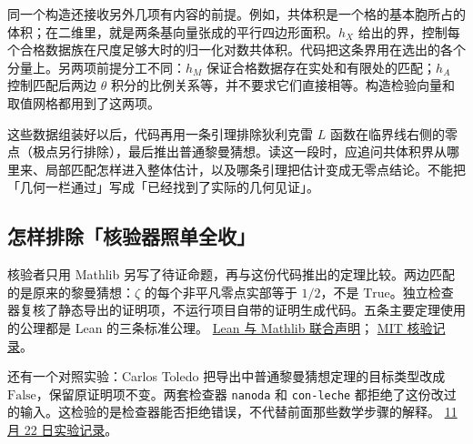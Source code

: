 同一个构造还接收另外几项有内容的前提。例如，共体积是一个格的基本胞所占的体积；在二维里，就是两条基向量张成的平行四边形面积。$h_X$ 给出的界，控制每个合格数据族在尺度足够大时的归一化对数共体积。代码把这条界用在选出的各个分量上。另两项前提分工不同：$h_M$ 保证合格数据存在实处和有限处的匹配；$h_A$ 控制匹配后两边 $\theta$ 积分的比例关系等，并不要求它们直接相等。构造检验向量和取值网格都用到了这两项。

这些数据组装好以后，代码再用一条引理排除狄利克雷 $L$ 函数在临界线右侧的零点（极点另行排除），最后推出普通黎曼猜想。读这一段时，应追问共体积界从哪里来、局部匹配怎样进入整体估计，以及哪条引理把估计变成无零点结论。不能把「几何一栏通过」写成「已经找到了实际的几何见证」。

\subsection{怎样排除「核验器照单全收」}

核验者只用 Mathlib 另写了待证命题，再与这份代码推出的定理比较。两边匹配的是原来的黎曼猜想：$\zeta$ 的每个非平凡零点实部等于 $1/2$，不是 $\mathrm{True}$。独立检查器复核了静态导出的证明项，不运行项目自带的证明生成代码。五条主要定理使用的公理都是 Lean 的三条标准公理。
\href{https://leanprover-community.github.io/blog/posts/riemann-hypothesis/}{Lean 与 Mathlib 联合声明}；
\href{https://math.mit.edu/~drew/grh/}{MIT 核验记录}。

还有一个对照实验：Carlos Toledo 把导出中普通黎曼猜想定理的目标类型改成 $\mathrm{False}$，保留原证明项不变。两套检查器 \texttt{nanoda} 和 \texttt{con-leche} 都拒绝了这份改过的输入。这检验的是检查器能否拒绝错误，不代替前面那些数学步骤的解释。
\href{https://carlostoledo.co/reports/alpoge-grh.html\#changes}{11 月 22 日实验记录}。

